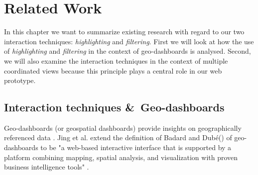 \chapter{Related Work}
In this chapter we want to summarize existing research with regard to our two interaction techniques:
\textit{highlighting} and \textit{filtering}. First we will look at how the use of \textit{highlighting}
and \textit{filtering} in the context of geo-dashboards is analysed. Second, we will also examine the
interaction techniques in the context of multiple coordinated views because this principle plays a central
role in our web prototype.

\section{Interaction techniques \&\ Geo-dashboards}
Geo-dashboards (or geospatial dashboards) provide insights on geographically referenced data \citep*{Bernasocchi.2012}.
Jing et al. extend the definition of Badard and Dubé(\citep*{ThierryBadard.2009}) of geo-dashboards to be "a web-based interactive interface that is supported by a platform combining
mapping, spatial analysis, and visualization with proven business intelligence tools" \citep*{Jing.2019}.

